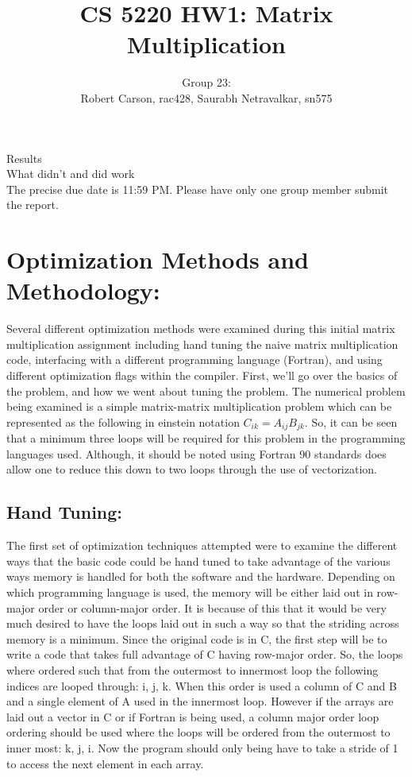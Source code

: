 \documentclass{article}
\begin{document}
\title{CS 5220 HW1: Matrix Multiplication}
\author{Group 23: \\Robert Carson, rac428, Saurabh Netravalkar, sn575}
\renewcommand{\today}{17 Sept. 2015}
\maketitle

\noindent Results \\
What didn't and did work \\
    
\noindent The precise due date is 11:59 PM. Please have only one group member submit the report. 

\section*{Optimization Methods and Methodology:} 

Several different optimization methods were examined during this initial matrix multiplication assignment including hand tuning the naive matrix multiplication code, interfacing with a different programming language (Fortran), and using different optimization flags within the compiler.  First, we'll go over the basics of the problem, and how we went about tuning the problem. The numerical problem being examined is a simple matrix-matrix multiplication problem which can be represented as the following in einstein notation  $C_{ik} = A_{ij}B_{jk}$. 
So, it can be seen that a minimum three loops will be required for this problem in the programming languages used. Although, it should be noted using Fortran 90 standards does allow one to reduce this down to two loops through the use of vectorization. 

\subsection*{Hand Tuning:}

The first set of optimization techniques attempted were to examine the different ways that the basic code could be hand tuned to take advantage of the various ways memory is handled for both the software and the hardware.  Depending on which programming language is used, the memory will be either laid out in row-major order or column-major order. It is because of this that it would be very much desired to have the loops laid out in such a way so that the striding across memory is a minimum. Since the original code is in C, the first step will be to write a code that takes full advantage of C having row-major order. So, the loops where ordered such that from the outermost to innermost loop the following indices are looped through: i, j, k. When this order is used a column of C and B and a single element of A used in the innermost loop. However if the arrays are laid out a vector in C or if Fortran is being used, a column major order loop ordering should be used where the loops will be ordered from the outermost to inner most: k, j, i. Now the program should only being have to take a stride of 1 to access the next element in each array.
\end{document}
